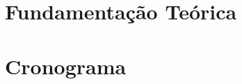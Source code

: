 \documentclass[
	12pt,				%
	openright,			%
	oneside,			%
	a4paper,			%
	chapter=TITLE,		%
	english,			%
	french,				%
	spanish,			%
	brazil				%
	]{abntex2}
\begin{document}
{\lipsum[1]


\chapter{Fundamentação Teórica}

\lipsum[1]


\chapter{Cronograma}

\lipsum[1]

















\printindex

}
\end{document}
